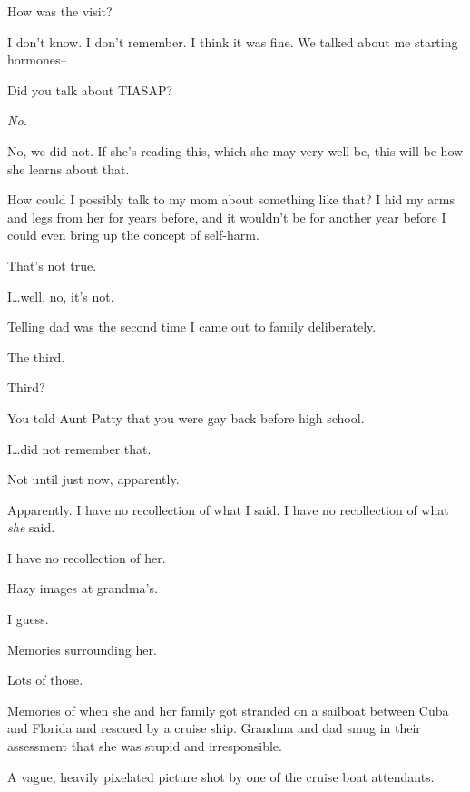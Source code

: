 \begin{paracol}{2}
\begin{leftcolumn}
\begin{ally}
How was the visit?
\end{ally}
I don't know. I don't remember. I think it was fine. We talked about me starting hormones--

\begin{ally}
Did you talk about TIASAP?
\end{ally}
\emph{No.}

No, we did not. If she's reading this, which she may very well be, this will be how she learns about that.

How could I possibly talk to my mom about something like that? I hid my arms and legs from her for years before, and it wouldn't be for another year before I could even bring up the concept of self-harm.

\begin{ally}
That's not true.
\end{ally}
I\ldots{}well, no, it's not.
\newpage

\noindent Telling dad was the second time I came out to family deliberately.

\begin{ally}
The third.
\end{ally}
Third?

\begin{ally}
You told Aunt Patty that you were gay back before high school.
\end{ally}
I\ldots{}did not remember that.

\begin{ally}
Not until just now, apparently.
\end{ally}
Apparently. I have no recollection of what I said. I have no recollection of what \emph{she} said.

I have no recollection of her.

\begin{ally}
Hazy images at grandma's.
\end{ally}
I guess.

\begin{ally}
Memories surrounding her.
\end{ally}
Lots of those.

\begin{ally}
Memories of when she and her family got stranded on a sailboat between Cuba and Florida and rescued by a cruise ship. Grandma and dad smug in their assessment that she was stupid and irresponsible.
\end{ally}
A vague, heavily pixelated picture shot by one of the cruise boat attendants.


\end{leftcolumn}
\end{paracol}
